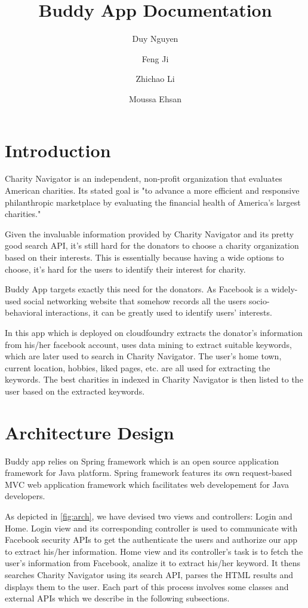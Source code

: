 \documentclass{article}
\begin{document}
\title{Buddy App Documentation	}


\author{
Duy Nguyen
\and
Feng Ji
\and
Zhichao Li
\and
Moussa Ehsan
}

\maketitle

\section{Introduction}
Charity Navigator is an independent, non-profit organization that evaluates American charities. Its stated goal is "to advance a more efficient and responsive philanthropic marketplace by evaluating the financial health of America's largest charities."

Given the invaluable information provided by Charity Navigator and its pretty good search API, it's still hard for the donators to choose a charity organization based on their interests. This is essentially because having a wide options to choose, it's hard for the users to identify their interest for charity. 

Buddy App targets exactly this need for the donators. As Facebook is a widely-used social networking website that somehow records all the users socio-behavioral interactions, it can be greatly used to identify users' interests. 

In this app which is deployed on cloudfoundry extracts the donator's information from his/her facebook account, uses data mining to extract suitable keywords, which are later used to search in Charity Navigator. The user's home town, current location, hobbies, liked pages, etc. are all used for extracting the keywords. The best charities in indexed in Charity Navigator is then listed to the user based on the extracted keywords.

\section{Architecture Design}
Buddy app relies on Spring framework which is an open source application framework for Java platform. Spring framework features its own request-based MVC web application framework which facilitates web developement for Java developers.

As depicted in \ref{fig:arch}, we have devised two views and controllers: Login and Home. Login view and its corresponding controller is used to communicate with Facebook security APIs to get the authenticate the users and authorize our app to extract his/her information. Home view and its controller's task is to fetch the user's information from Facebook, analize it to extract his/her keyword. It thens searches Charity Navigator using its search API, parses the HTML results and displays them to the user. Each part of this process involves some classes and external APIs which we describe in the following subsections.
\end{document}

